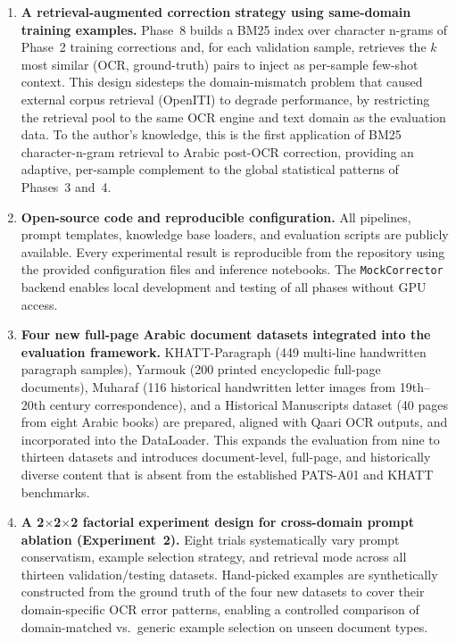 \begin{enumerate}
  \item \textbf{A retrieval-augmented correction strategy using same-domain
  training examples.} Phase~8 builds a BM25 index over character n-grams
  of Phase~2 training corrections and, for each validation sample, retrieves
  the $k$ most similar (OCR, ground-truth) pairs to inject as per-sample
  few-shot context. This design sidesteps the domain-mismatch problem that
  caused external corpus retrieval (OpenITI) to degrade performance, by
  restricting the retrieval pool to the same OCR engine and text domain as
  the evaluation data. To the author's knowledge, this is the first
  application of BM25 character-n-gram retrieval to Arabic post-OCR
  correction, providing an adaptive, per-sample complement to the global
  statistical patterns of Phases~3 and~4.

  \item \textbf{Open-source code and reproducible configuration.}
  All pipelines, prompt templates, knowledge base loaders, and evaluation
  scripts are publicly available. Every experimental result is reproducible
  from the repository using the provided configuration files and inference
  notebooks. The \texttt{MockCorrector} backend enables local development
  and testing of all phases without GPU access.

  \item \textbf{Four new full-page Arabic document datasets integrated into
  the evaluation framework.} KHATT-Paragraph (449 multi-line handwritten
  paragraph samples), Yarmouk (200 printed encyclopedic full-page documents),
  Muharaf (116 historical handwritten letter images from 19th--20th century
  correspondence), and a Historical Manuscripts dataset (40 pages from eight
  Arabic books) are prepared, aligned with Qaari OCR outputs, and incorporated
  into the DataLoader. This expands the evaluation from nine to thirteen
  datasets and introduces document-level, full-page, and historically diverse
  content that is absent from the established PATS-A01 and KHATT benchmarks.

  \item \textbf{A 2$\times$2$\times$2 factorial experiment design for
  cross-domain prompt ablation (Experiment~2).} Eight trials systematically
  vary prompt conservatism, example selection strategy, and retrieval mode
  across all thirteen validation/testing datasets. Hand-picked examples are
  synthetically constructed from the ground truth of the four new datasets
  to cover their domain-specific OCR error patterns, enabling a controlled
  comparison of domain-matched vs.\ generic example selection on unseen
  document types.

\end{enumerate}


